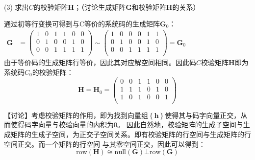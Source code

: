     (3) 求出$C$的校验矩阵$\bm{H}$；（讨论生成矩阵$\bm{G}$和校验矩阵$\bm{H}$的关系）

\begin{Solution}
通过初等行变换可得到与C等价的系统码的生成矩阵$\bm{G}_0$：\\
    
        $
        \begin{aligned}
            \bm{G} &= \left(
            \begin{matrix}
                1 &0 &1 &1 &0 &0\\
                0 &1 &0 &0 &1 &0\\
                0 &0 &1 &1 &1 &1\\
            \end{matrix}
        \right)
        \sim
        \left(
            \begin{matrix}
                1 &0 &0 &0 &1 &1\\
                0 &1 &0 &0 &1 &0\\
                0 &0 &1 &1 &1 &1\\
            \end{matrix}
        \right)
        = \bm{G}_0
        \end{aligned}
        $\\
    
        由于等价码的生成矩阵行等价，因此其对应解空间相同。因此码$C$校验矩阵$\bm{H}$即为系统码$C_0$的校验矩阵：
        \begin{equation}
            \bm{H} = \bm{H}_0=
            \left(
                \begin{matrix}
                    0 &0 &1 &1 &0 &0\\
                    1 &1 &1 &0 &1 &0\\
                    1 &0 &1 &0 &0 &1\\
                \end{matrix}
            \right)
        \end{equation}

        【讨论】考虑校验矩阵的作用，即为找到向量组$\left\{\bm{h}\right\}$使得其与码字向量正交，从而使得码字向量与校验向量的内积为$0$。
        因此自然地，校验矩阵的生成子空间与生成矩阵的生成子空间，为正交子空间关系。即有校验矩阵的行空间与生成矩阵的行空间正交。而一个矩阵的行空间
        与其零空间正交，因此可以得到：
        \begin{equation}
            \label{eq:HG}
            \mathrm{row}(\bm{H}) \cong \mathrm{null}(\bm{G}) \bot \mathrm{row}(\bm{G})
        \end{equation}


\end{Solution}

